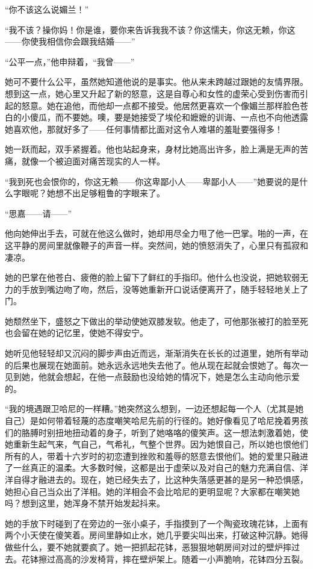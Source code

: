 \par “你不该这么说媚兰！”
\par “我不该？操你妈！你是谁，要你来告诉我我不该？你这懦夫，你这无赖，你这——你使我相信你会跟我结婚——”
\par “公平一点，”他申辩着，“我曾——”
\par 她可不要什么公平，虽然她知道他说的是事实。他从来未跨越过跟她的友情界限。想到这一点，她心里又升起了新的怒意，这是自尊心和女性的虚荣心受到伤害而引起的怒意。她在追他，而他却一点都不接受。他居然更喜欢一个像媚兰那样脸色苍白的小傻瓜，而不要她。噢，要是她接受了埃伦和嬷嬷的训诲、一点也不向他透露她喜欢他，那就好多了——任何事情都比面对这令人难堪的羞耻要强得多！
\par 她一跃而起，双手紧握着。他也站起身来，身材比她高出许多，脸上满是无声的苦痛，就像一个被迫面对痛苦现实的人一样。
\par “我到死也会恨你的，你这无赖——你这卑鄙小人——卑鄙小人——”她要说的是什么字眼呢？她想不出足够粗鲁的字眼来了。
\par “思嘉——请——”
\par 他向她伸出手去，可就在他这么做时，她却用尽全力甩了他一巴掌。啪的一声，在这平静的房间里就像鞭子的声音一样。突然间，她的愤怒消失了，心里只有孤寂和凄凉。
\par 她的巴掌在他苍白、疲倦的脸上留下了鲜红的手指印。他什么也没说，把她软弱无力的手放到嘴边吻了吻，然后，没等她重新开口说话便离开了，随手轻轻地关上了门。
\par 她颓然坐下，盛怒之下做出的举动使她双膝发软。他走了，可他那张被打的脸至死也会留在她的记忆里，使她不得安宁。
\par 她听见他轻轻却又沉闷的脚步声由近而远，渐渐消失在长长的过道里，她所有举动的后果也展现在她面前。她永远永远地失去他了。他从现在起就会恨她了。每次一见到她，他就会想起，在他一点鼓励也没给她的情况下，她是怎么主动向他示爱的。
\par “我的境遇跟卫哈尼的一样糟。”她突然这么想到，一边还想起每一个人（尤其是她自己）是如何带着轻蔑的态度嘲笑哈尼先前的行径的。她好像看见了哈尼挽着男孩们的胳膊时别扭地扭动着的身子，听到了她咯咯的傻笑声。这一想法刺激着她，使她重新生起气来，气自己，气希礼，气整个世界。因为她恨自己，所以她也恨他们所有的人，带着十六岁时的初恋遭到挫败和羞辱的怒意去恨他们。她的爱里只融进了一丝真正的温柔。大多数时候，这都是出于虚荣以及对自己的魅力充满自信、洋洋自得才融进去的。现在，她已经失去了，比这种失落感更甚的是另一种恐惧感，她担心自己当众出了洋相。她的洋相会不会比哈尼的更明显呢？大家都在嘲笑她吗？想到这里，她浑身不禁开始发起抖来。
\par 她的手放下时碰到了在旁边的一张小桌子，手指摸到了一个陶瓷玫瑰花钵，上面有两个小天使在傻笑着。房间里静如止水，她几乎要尖叫出来，打破这种沉静。她得做些什么，要不她就要疯了。她一把抓起花钵，恶狠狠地朝房间对过的壁炉摔过去。花钵擦过高高的沙发椅背，摔在壁炉架上。随着一小声脆响，花钵四分五裂。

